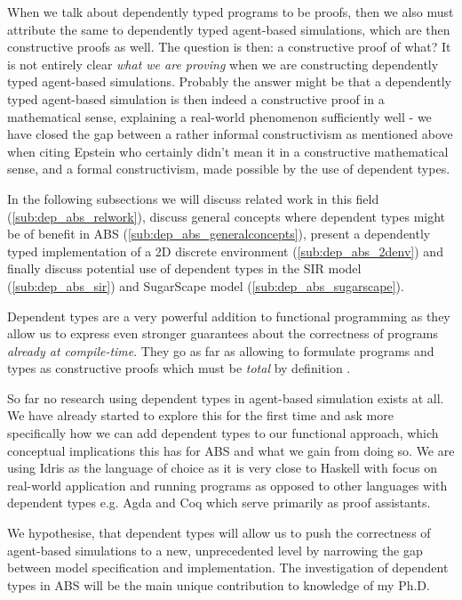 When we talk about dependently typed programs to be proofs, then we also must attribute the same to dependently typed agent-based simulations, which are then constructive proofs as well. The question is then: a constructive proof of what? It is not entirely clear \textit{what we are proving} when we are constructing dependently typed agent-based simulations. Probably the answer might be that a dependently typed agent-based simulation is then indeed a constructive proof in a mathematical sense, explaining a real-world phenomenon sufficiently well - we have closed the gap between a rather informal constructivism as mentioned above when citing Epstein who certainly didn't mean it in a constructive mathematical sense, and a formal constructivism, made possible by the use of dependent types.

In the following subsections we will discuss related work in this field (\ref{sub:dep_abs_relwork}), discuss general concepts where dependent types might be of benefit in ABS (\ref{sub:dep_abs_generalconcepts}), present a dependently typed implementation of a 2D discrete environment (\ref{sub:dep_abs_2denv}) and finally discuss potential use of dependent types in the SIR model (\ref{sub:dep_abs_sir}) and SugarScape model (\ref{sub:dep_abs_sugarscape}).

Dependent types are a very powerful addition to functional programming as they allow us to express even stronger guarantees about the correctness of programs \textit{already at compile-time}. They go as far as allowing to formulate programs and types as constructive proofs which must be \textit{total} by definition \cite{thompson_type_1991, mckinna_why_2006, altenkirch_pi_2010}. 

So far no research using dependent types in agent-based simulation exists at all. We have already started to explore this for the first time and ask more specifically how we can add dependent types to our functional approach, which conceptual implications this has for ABS and what we gain from doing so. We are using Idris \cite{brady_idris_2013} as the language of choice as it is very close to Haskell with focus on real-world application and running programs as opposed to other languages with dependent types e.g. Agda and Coq which serve primarily as proof assistants.

We hypothesise, that  dependent types will allow us to push the correctness of agent-based simulations to a new, unprecedented level by narrowing the gap between model specification and implementation. The investigation of dependent types in ABS will be the main unique contribution to knowledge of my Ph.D.

